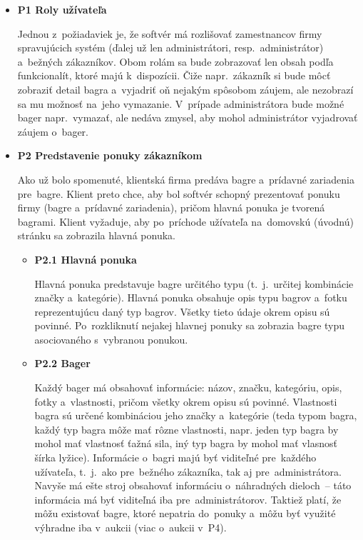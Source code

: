 \begin{itemize}
\item \textbf{P1 Roly užívateľa}
\label{roly uzivatela}

Jednou z~požiadaviek je, že softvér má rozlišovať zamestnancov firmy spravujúcich systém (ďalej už len administrátori, resp.~administrátor) a~bežných zákazníkov. Obom rolám sa bude zobrazovať len obsah podľa funkcionalít, ktoré majú k~dispozícii. Čiže napr.~zákazník si bude môcť zobraziť detail bagra a~vyjadriť oň nejakým spôsobom záujem, ale nezobrazí sa mu možnosť na~jeho vymazanie. V~prípade administrátora bude možné bager napr.~vymazať, ale nedáva zmysel, aby mohol administrátor vyjadrovať záujem o~bager.

\item \textbf{P2 Predstavenie ponuky zákazníkom}

Ako už bolo spomenuté, klientská firma predáva bagre a~prídavné zariadenia pre~bagre. Klient preto chce, aby bol softvér schopný prezentovať ponuku firmy (bagre a~prídavné zariadenia), pričom hlavná ponuka je tvorená bagrami. Klient vyžaduje, aby po~príchode užívateľa na~domovskú (úvodnú) stránku sa zobrazila hlavná ponuka.

\begin{itemize}
\item \textbf{P2.1 Hlavná ponuka}

Hlavná ponuka predstavuje bagre určitého typu (t.~j.~určitej kombinácie značky a~kategórie). Hlavná ponuka obsahuje opis typu bagrov a~fotku reprezentujúcu daný typ bagrov. Všetky tieto údaje okrem opisu sú povinné. Po~rozkliknutí nejakej hlavnej ponuky sa zobrazia bagre typu asociovaného s~vybranou ponukou.

\item \textbf{P2.2 Bager}

Každý bager má obsahovať informácie: názov, značku, kategóriu, opis, fotky a~vlastnosti, pričom všetky okrem opisu sú povinné. Vlastnosti bagra sú určené kombináciou jeho značky a~kategórie (teda typom bagra, každý typ bagra môže mať rôzne vlastnosti, napr. jeden typ bagra by mohol mať vlastnosť ťažná sila, iný typ bagra by mohol mať vlasnosť šírka lyžice). Informácie o~bagri majú byť viditeľné pre~každého užívateľa, t.~j.~ako pre~bežného zákazníka, tak aj pre~administrátora. Navyše má ešte stroj obsahovať informáciu o~náhradných dieloch~-- táto informácia má byť viditeľná iba pre~administrátorov. Taktiež platí, že môžu existovať bagre, ktoré nepatria do~ponuky a~môžu byť využité výhradne iba v~aukcii (viac o~aukcii v~P4).


\end{itemize}
\end{itemize}
